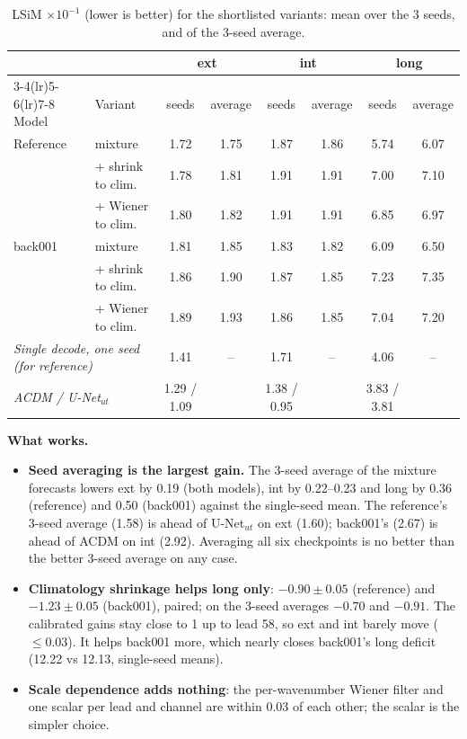 \documentclass[10.5pt,a4paper]{article}
\begin{document}
\begin{table}[h]
\centering\scriptsize
\caption{LSiM $\times10^{-1}$ (lower is better) for the shortlisted variants: mean over the 3
seeds, and of the 3-seed average.}
\label{tab:pplsim}
\begin{tabular}{llcccccc}
\toprule
 & & \multicolumn{2}{c}{ext} & \multicolumn{2}{c}{int} & \multicolumn{2}{c}{long}\\
\cmidrule(lr){3-4}\cmidrule(lr){5-6}\cmidrule(lr){7-8}
Model & Variant & seeds & average & seeds & average & seeds & average\\
\midrule
Reference & mixture            & 1.72 & 1.75 & 1.87 & 1.86 & 5.74 & 6.07\\
          & + shrink to clim.  & 1.78 & 1.81 & 1.91 & 1.91 & 7.00 & 7.10\\
          & + Wiener to clim.  & 1.80 & 1.82 & 1.91 & 1.91 & 6.85 & 6.97\\
\midrule
back001   & mixture            & 1.81 & 1.85 & 1.83 & 1.82 & 6.09 & 6.50\\
          & + shrink to clim.  & 1.86 & 1.90 & 1.87 & 1.85 & 7.23 & 7.35\\
          & + Wiener to clim.  & 1.89 & 1.93 & 1.86 & 1.85 & 7.04 & 7.20\\
\midrule
\multicolumn{2}{l}{\emph{Single decode, one seed (for reference)}} & 1.41 & -- & 1.71 & -- & 4.06 & --\\
\multicolumn{2}{l}{\emph{ACDM / U-Net$_{ut}$}} & 1.29 / 1.09 & & 1.38 / 0.95 & & 3.83 / 3.81 & \\
\bottomrule
\end{tabular}
\end{table}

\FloatBarrier
\textbf{What works.}
\begin{itemize}
\item \textbf{Seed averaging is the largest gain.} The 3-seed average of the mixture forecasts
  lowers ext by 0.19 (both models), int by 0.22--0.23 and long by 0.36 (reference) and 0.50
  (back001) against the single-seed mean. The reference's 3-seed average (1.58) is ahead of
  U-Net$_{ut}$ on ext (1.60); back001's (2.67) is ahead of ACDM on int (2.92). Averaging all six
  checkpoints is no better than the better 3-seed average on any case.
\item \textbf{Climatology shrinkage helps long only}: $-0.90\pm0.05$ (reference) and
  $-1.23\pm0.05$ (back001), paired; on the 3-seed averages $-0.70$ and $-0.91$. The calibrated
  gains stay close to 1 up to lead 58, so ext and int barely move ($\le0.03$). It helps back001
  more, which nearly closes back001's long deficit (12.22 vs 12.13, single-seed means).
\item \textbf{Scale dependence adds nothing}: the per-wavenumber Wiener filter and one scalar per
  lead and channel are within 0.03 of each other; the scalar is the simpler choice.
\end{itemize}
\end{document}
